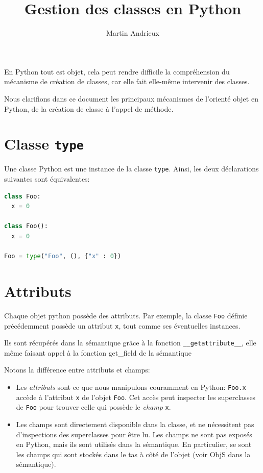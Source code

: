 \documentclass[a4paper, french, 11pt]{article}
\date{}
\title{Gestion des classes en Python}
\author{Martin Andrieux}
\theoremstyle{break}
\begin{document}
\maketitle

En Python tout est objet, cela peut rendre difficile la compréhension du mécanisme de création de classes, car elle fait elle-même intervenir des classes.

Nous clarifions dans ce document les principaux mécanismes de l'orienté objet en Python, de la création de classe à l'appel de méthode.

\section{Classe \texttt{type}}
Une classe Python est une instance de la classe \texttt{type}.
Ainsi, les deux déclarations suivantes sont équivalentes:

\begin{lstlisting}[style=myStyle, language=python]
class Foo:
  x = 0

class Foo():
  x = 0

Foo = type("Foo", (), {"x" : 0})
\end{lstlisting}


\section{Attributs}
Chaque objet python possède des attributs.
Par exemple, la classe \texttt{Foo} définie précédemment possède un attribut \texttt{x}, tout comme ses éventuelles instances.


Ils sont récupérés dans la sémantique grâce à la fonction \texttt{\_\_getattribute\_\_}, elle même faisant appel à la fonction \textsf{get\_field} de la sémantique

Notons la différence entre \og attributs\fg{} et \og champs\fg{}:
\begin{itemize}
  \item Les \emph{attributs} sont ce que nous manipulons couramment en Python: \texttt{Foo.x} accède à l'attribut \texttt{x} de l'objet \texttt{Foo}.
    Cet accès peut inspecter les superclasses de \texttt{Foo} pour trouver celle qui possède le \emph{champ} \texttt{x}.
  \item Les champs sont directement disponible dans la classe, et ne nécessitent pas d'inspections des superclasses pour être lu.
    Les champs ne sont pas exposés en Python, mais ils sont utilisés dans la sémantique.
    En particulier, se sont les champs qui sont stockés dans le tas à côté de l'objet (voir \textsf{ObjS} dans la sémantique).
\end{itemize}
\end{document}
